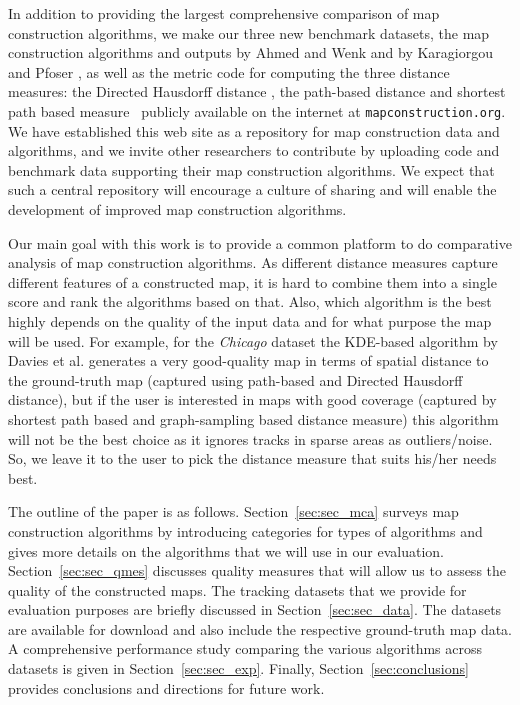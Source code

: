 \documentclass[natbib]{svjour3}                    \smartqed  \usepackage[table]{xcolor}
\begin{document}
In addition to providing the largest comprehensive comparison of map construction algorithms, we make our three new benchmark datasets, the map construction algorithms and outputs by Ahmed and Wenk \cite{csm_esa2012} and by Karagiorgou and Pfoser \cite{Karagiorgou:2012:VTD:2424321.2424334}, as well as the metric code for computing the three distance measures: the Directed Hausdorff distance \cite{ag-dgsmi-99}, the path-based distance \cite{aw-SIGSPATIAL-13} and shortest path based measure~\cite{Karagiorgou:2012:VTD:2424321.2424334} publicly available on the internet at \mbox{\tt mapconstruction.org}. We have established this web site as a repository for map construction data and algorithms, and we invite other researchers to contribute by uploading code and benchmark data supporting their map construction algorithms. We expect that such a central repository will encourage a culture of sharing and will enable the development of improved map construction algorithms.

Our main goal with this work is to provide a common platform to do comparative analysis of map construction algorithms. As different distance measures capture different features of a constructed map, it is hard to combine them into a single score and rank the algorithms based on that. Also, which algorithm is the best highly depends on the quality of the input data and for what purpose the map will be used. For example, for the \emph{Chicago} dataset the KDE-based algorithm by Davies et al. \cite{Davies:2006:SDR:1175887.1176088} generates a very good-quality map in terms of spatial distance to the ground-truth map (captured using path-based and Directed Hausdorff distance), but if the user is interested in maps with good coverage (captured by shortest path based and graph-sampling based distance measure) this algorithm will not be the best choice as it ignores tracks in sparse areas as outliers/noise. So, we leave it to the user to pick the distance measure that suits his/her needs best.

The outline of the paper is as follows. 
Section~\ref{sec:sec_mca} surveys map construction algorithms by introducing categories for types of algorithms and gives more details on the algorithms that we will use in our evaluation. 
Section~\ref{sec:sec_qmes} discusses quality measures that will allow us to assess the quality of the constructed maps. The tracking datasets that we provide for evaluation purposes are briefly discussed in Section~\ref{sec:sec_data}. The datasets are available for download and also include the respective ground-truth map data. A comprehensive performance study comparing the various algorithms across datasets is given in Section~\ref{sec:sec_exp}. Finally, Section~\ref{sec:conclusions} provides conclusions and directions for future work.  
\end{document}
